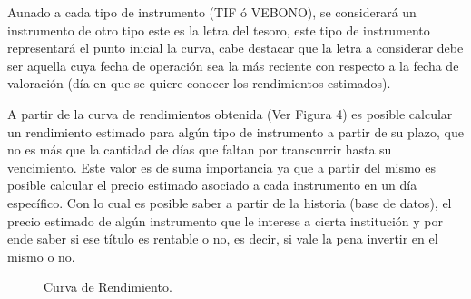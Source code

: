 \hspace{0.4cm} Aunado a cada tipo de instrumento (TIF \'o VEBONO), se considerar\'a un instrumento de otro tipo este es la letra del tesoro, este tipo de instrumento representar\'a el punto inicial la curva, cabe destacar que la letra a considerar debe ser aquella cuya fecha de operaci\'on sea la m\'as reciente con respecto a la fecha de valoraci\'on (d\'ia en que se quiere conocer los rendimientos estimados).

\vspace{0.5cm}

\hspace{0.4cm} A partir de la curva de rendimientos obtenida (Ver Figura 4) es posible calcular un rendimiento estimado para alg\'un tipo de instrumento a partir de su plazo, que no es m\'as que la cantidad de d\'ias que faltan por transcurrir hasta su vencimiento. Este valor es de suma importancia ya que a partir del mismo es posible calcular el precio estimado asociado a cada instrumento en un d\'ia espec\'ifico. Con lo cual es posible saber a partir de la historia (base de datos), el precio estimado de alg\'un instrumento que le interese a cierta instituci\'on y por ende saber si ese t\'itulo es rentable o no, es decir, si vale la pena invertir en el mismo o no.\\

\begin{figure}[h]
\caption{Curva de Rendimiento.}
\end{figure}



